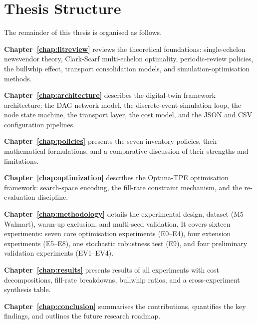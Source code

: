 \section{Thesis Structure}
\label{sec:intro:structure}

The remainder of this thesis is organised as follows.

\textbf{Chapter~\ref{chap:litreview}} reviews the theoretical foundations:
single-echelon newsvendor theory, Clark-Scarf multi-echelon optimality,
periodic-review policies, the bullwhip effect, transport consolidation
models, and simulation-optimisation methods.

\textbf{Chapter~\ref{chap:architecture}} describes the digital-twin
framework architecture: the DAG network model, the discrete-event
simulation loop, the node state machine, the transport layer, the cost
model, and the JSON and CSV configuration pipelines.

\textbf{Chapter~\ref{chap:policies}} presents the seven inventory policies,
their mathematical formulations, and a comparative discussion of their
strengths and limitations.

\textbf{Chapter~\ref{chap:optimization}} describes the Optuna-TPE
optimisation framework: search-space encoding, the fill-rate constraint
mechanism, and the re-evaluation discipline.

\textbf{Chapter~\ref{chap:methodology}} details the experimental design,
dataset (M5 Walmart), warm-up exclusion, and multi-seed validation.  It
covers sixteen experiments: seven core optimisation experiments (E0--E4),
four extension experiments (E5--E8), one stochastic robustness test (E9),
and four preliminary validation experiments (EV1--EV4).

\textbf{Chapter~\ref{chap:results}} presents results of all experiments
with cost decompositions, fill-rate breakdowns, bullwhip ratios, and a
cross-experiment synthesis table.

\textbf{Chapter~\ref{chap:conclusion}} summarises the contributions,
quantifies the key findings, and outlines the future research roadmap.

